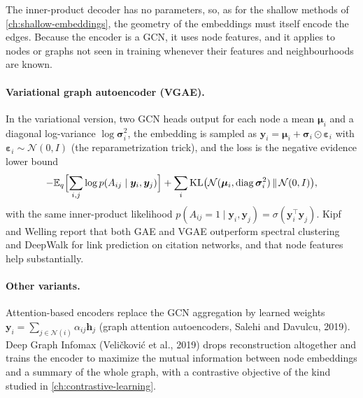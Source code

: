 \begin{notechapter}
The inner-product decoder has no parameters, so, as for the shallow methods of \cref{ch:shallow-embeddings}, the geometry of the embeddings must itself encode the edges. Because the encoder is a GCN, it uses node features, and it applies to nodes or graphs not seen in training whenever their features and neighbourhoods are known.

\paragraph{Variational graph autoencoder (VGAE).} In the variational version, two GCN heads output for each node a mean $\boldsymbol\mu_i$ and a diagonal log-variance $\log\boldsymbol\sigma_i^2$, the embedding is sampled as $\bm y_i = \boldsymbol\mu_i + \boldsymbol\sigma_i\odot\boldsymbol\varepsilon_i$ with $\boldsymbol\varepsilon_i \sim \mathcal N(0, I)$ (the reparametrization trick), and the loss is the negative evidence lower bound
\[
-\mathbb{E}_q\Bigl[\sum_{i,j}\log p(A_{ij}\mid\bm y_i,\bm y_j)\Bigr] + \sum_i\mathrm{KL}\bigl(\mathcal N(\boldsymbol\mu_i, \operatorname{diag}\boldsymbol\sigma_i^2)\,\|\,\mathcal N(0, I)\bigr),
\]
with the same inner-product likelihood $p(A_{ij} = 1\mid\bm y_i,\bm y_j) = \sigma(\bm y_i^\top\bm y_j)$. Kipf and Welling report that both GAE and VGAE outperform spectral clustering and DeepWalk for link prediction on citation networks, and that node features help substantially.

\paragraph{Other variants.} Attention-based encoders replace the GCN aggregation by learned weights $\bm y_i = \sum_{j\in\mathcal N(i)}\alpha_{ij}\bm h_j$ (graph attention autoencoders, Salehi and Davulcu, 2019). Deep Graph Infomax (Veličković et al., 2019) drops reconstruction altogether and trains the encoder to maximize the mutual information between node embeddings and a summary of the whole graph, with a contrastive objective of the kind studied in \cref{ch:contrastive-learning}.


\end{notechapter}
